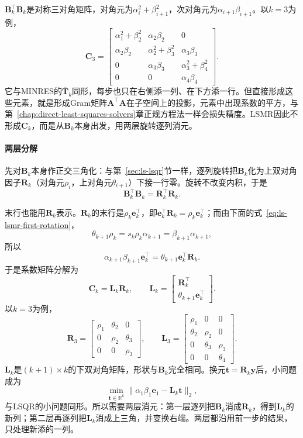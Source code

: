 $\bm B_k^\top\bm B_k$是对称三对角矩阵，对角元为$\alpha_i^2+\beta_{i+1}^2$，次对角元为$\alpha_{i+1}\beta_{i+1}$。以$k=3$为例，
\[
 \bm C_3=
 \begin{bmatrix}
 \alpha_1^2+\beta_2^2&\alpha_2\beta_2&0\\
 \alpha_2\beta_2&\alpha_2^2+\beta_3^2&\alpha_3\beta_3\\
 0&\alpha_3\beta_3&\alpha_3^2+\beta_4^2\\
 0&0&\alpha_4\beta_4
 \end{bmatrix}.
\]
它与MINRES的$\overline{\bm T}_k$同形，每步也只在右侧添一列、在下方添一行。但直接形成这些元素，就是形成Gram矩阵$\bm A^\top\bm A$在子空间上的投影，元素中出现系数的平方，与第~\ref{chap:direct-least-squares-solvers}章正规方程法一样会损失精度。LSMR因此不形成$\bm C_k$，而是从$\bm B_k$本身出发，用两层旋转逐列消元。

\paragraph{两层分解}
先对$\bm B_k$本身作正交三角化：与第~\ref{sec:ls-lsqr}节一样，逐列旋转把$\bm B_k$化为上双对角因子$\bm R_k$（对角元$\rho_i$，上对角元$\theta_{i+1}$）下接一行零。旋转不改变内积，于是
\[
 \bm B_k^\top\bm B_k=\bm R_k^\top\bm R_k .
\]

末行也能用$\bm R_k$表示。$\bm R_k$的末行是$\rho_k\bm e_k^\top$，即$\bm e_k^\top\bm R_k=\rho_k\bm e_k^\top$；而由下面的式~\eqref{eq:ls-lsmr-first-rotation}，
\[
 \theta_{k+1}\rho_k=s_k\rho_k\alpha_{k+1}=\beta_{k+1}\alpha_{k+1} ,
\]
所以
\[
 \alpha_{k+1}\beta_{k+1}\bm e_k^\top=\theta_{k+1}\bm e_k^\top\bm R_k .
\]
于是系数矩阵分解为
\begin{equation}
 \bm C_k=\bm L_k\bm R_k,\qquad
 \bm L_k=\begin{bmatrix}\bm R_k^\top\\ \theta_{k+1}\bm e_k^\top\end{bmatrix}.
 \label{eq:ls-lsmr-factorization}
\end{equation}
以$k=3$为例，
\[
 \bm R_3=\begin{bmatrix}\rho_1&\theta_2&0\\0&\rho_2&\theta_3\\0&0&\rho_3\end{bmatrix},\qquad
 \bm L_3=\begin{bmatrix}\rho_1&0&0\\\theta_2&\rho_2&0\\0&\theta_3&\rho_3\\0&0&\theta_4\end{bmatrix}.
\]
$\bm L_k$是$(k+1)\times k$的下双对角矩阵，形状与$\bm B_k$完全相同。换元$\bm t=\bm R_k\bm y$后，小问题成为
\[
 \min_{\bm t\in\mathbb R^k}\lVert\alpha_1\beta_1\bm e_1-\bm L_k\bm t\rVert_2 ,
\]
与LSQR的小问题同形。所以需要两层消元：第一层逐列把$\bm B_k$消成$\bm R_k$，得到$\bm L_k$的新列；第二层再逐列把$\bm L_k$消成上三角，并变换右端。两层都沿用前一步的结果，只处理新添的一列。

